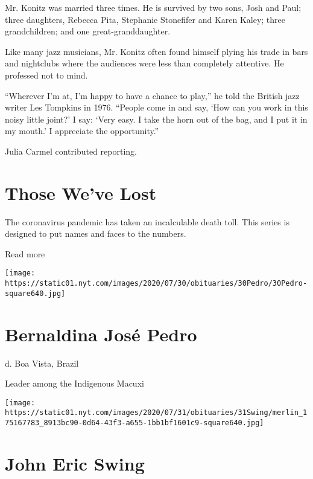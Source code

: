 Mr. Konitz was married three times. He is survived by two sons, Josh and
Paul; three daughters, Rebecca Pita, Stephanie Stonefifer and Karen
Kaley; three grandchildren; and one great-granddaughter.

Like many jazz musicians, Mr. Konitz often found himself plying his
trade in bars and nightclubs where the audiences were less than
completely attentive. He professed not to mind.

``Wherever I'm at, I'm happy to have a chance to play,'' he told the
British jazz writer Les Tompkins in 1976. ``People come in and say, `How
can you work in this noisy little joint?' I say: `Very easy. I take the
horn out of the bag, and I put it in my mouth.' I appreciate the
opportunity.''

Julia Carmel contributed reporting.

\href{https://www.nytimes.com/interactive/2020/obituaries/people-died-coronavirus-obituaries.html?action=click\&pgtype=Article\&state=default\&region=BELOW_MAIN_CONTENT\&context=covid_obits_promo}{}

\hypertarget{those-weve-lost}{%
\section{Those We've Lost}\label{those-weve-lost}}

The coronavirus pandemic has taken an incalculable death toll. This
series is designed to put names and faces to the numbers.

Read more

\texttt{[image: https://static01.nyt.com/images/2020/07/30/obituaries/30Pedro/30Pedro-square640.jpg]}

\hypertarget{bernaldina-josuxe9-pedro}{%
\section{Bernaldina José Pedro}\label{bernaldina-josuxe9-pedro}}

d. Boa Vista, Brazil

Leader among the Indigenous Macuxi

\texttt{[image: https://static01.nyt.com/images/2020/07/31/obituaries/31Swing/merlin\_175167783\_8913bc90-0d64-43f3-a655-1bb1bf1601c9-square640.jpg]}

\hypertarget{john-eric-swing}{%
\section{John Eric Swing}\label{john-eric-swing}}

